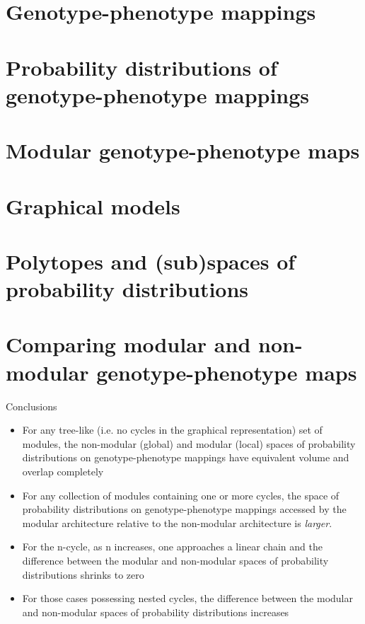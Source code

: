 	\section[GP maps]{Genotype-phenotype mappings}
	
		
	\section[PDs of GPs]{Probability distributions of genotype-phenotype mappings}
    

	\section[Modular GPs]{Modular genotype-phenotype maps}
	
	
	\section[GMs]{Graphical models}
	

	\section[PTs and PDs]{Polytopes and (sub)spaces of probability distributions}
		

	\section[PD comp]{Comparing modular and non-modular genotype-phenotype maps}
	
	
	\begin{frame}
	\begin{block}{Conclusions}
	\begin{small}	
	\begin{itemize}
	\item For any tree-like (i.e. no cycles in the graphical representation) set of modules, the non-modular (global) and modular (local) spaces of probability distributions on genotype-phenotype mappings have equivalent volume and overlap completely
	\item For any collection of modules containing one or more cycles, the space of probability distributions on genotype-phenotype mappings accessed by the modular architecture relative to the non-modular architecture is \emph{larger}.
	\item For the n-cycle, as n increases, one approaches a linear chain and the difference between the modular and non-modular spaces of probability distributions shrinks to zero
	\item For those cases possessing nested cycles, the difference between the modular and non-modular spaces of probability distributions increases
	\end{itemize}		
	\end{small}
	\end{block}
	\end{frame}

